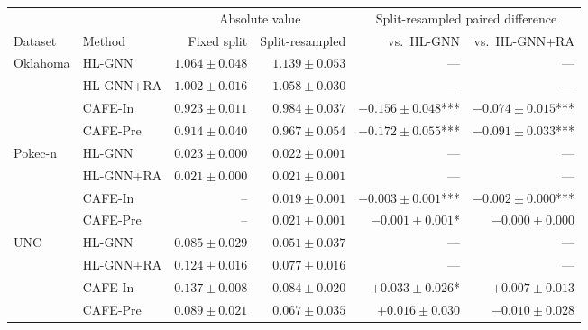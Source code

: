 \begin{tabular}{llrrrr}
\toprule
 & & \multicolumn{2}{c}{Absolute value} & \multicolumn{2}{c}{Split-resampled paired difference} \\
\cmidrule(lr){3-4}\cmidrule(lr){5-6}
Dataset & Method & Fixed split & Split-resampled & vs.\ HL-GNN & vs.\ HL-GNN+RA \\
\midrule
Oklahoma & HL-GNN & $1.064 \pm 0.048$ & $1.139 \pm 0.053$ & --- & --- \\
 & HL-GNN+RA & $1.002 \pm 0.016$ & $1.058 \pm 0.030$ & --- & --- \\
 & CAFE-In & $0.923 \pm 0.011$ & $0.984 \pm 0.037$ & $-0.156 \pm 0.048$*** & $-0.074 \pm 0.015$*** \\
 & CAFE-Pre & $0.914 \pm 0.040$ & $0.967 \pm 0.054$ & $-0.172 \pm 0.055$*** & $-0.091 \pm 0.033$*** \\
\addlinespace[2pt]
Pokec-n & HL-GNN & $0.023 \pm 0.000$ & $0.022 \pm 0.001$ & --- & --- \\
 & HL-GNN+RA & $0.021 \pm 0.000$ & $0.021 \pm 0.001$ & --- & --- \\
 & CAFE-In & -- & $0.019 \pm 0.001$ & $-0.003 \pm 0.001$*** & $-0.002 \pm 0.000$*** \\
 & CAFE-Pre & -- & $0.021 \pm 0.001$ & $-0.001 \pm 0.001$* & $-0.000 \pm 0.000$ \\
\addlinespace[2pt]
UNC & HL-GNN & $0.085 \pm 0.029$ & $0.051 \pm 0.037$ & --- & --- \\
 & HL-GNN+RA & $0.124 \pm 0.016$ & $0.077 \pm 0.016$ & --- & --- \\
 & CAFE-In & $0.137 \pm 0.008$ & $0.084 \pm 0.020$ & $+0.033 \pm 0.026$* & $+0.007 \pm 0.013$ \\
 & CAFE-Pre & $0.089 \pm 0.021$ & $0.067 \pm 0.035$ & $+0.016 \pm 0.030$ & $-0.010 \pm 0.028$ \\
\bottomrule
\end{tabular}
\vspace{6pt}

